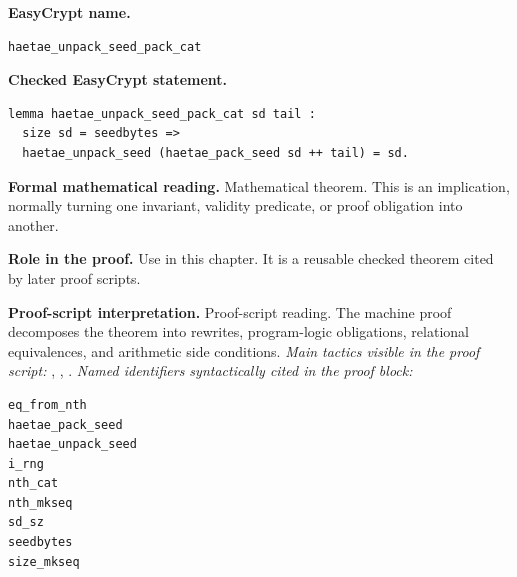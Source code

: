 \begin{formaltheorem}
\noindent\textbf{EasyCrypt name.}
\begin{lstlisting}[language=EasyCrypt,basicstyle=\ttfamily\scriptsize]
haetae_unpack_seed_pack_cat
\end{lstlisting}
\noindent\textbf{Checked EasyCrypt statement.}
\begin{lstlisting}[language=EasyCrypt,basicstyle=\ttfamily\scriptsize]
lemma haetae_unpack_seed_pack_cat sd tail :
  size sd = seedbytes =>
  haetae_unpack_seed (haetae_pack_seed sd ++ tail) = sd.
\end{lstlisting}
\noindent\textbf{Formal mathematical reading.}
Mathematical theorem. This is an implication, normally turning one invariant, validity predicate, or proof obligation into another.

\noindent\textbf{Role in the proof.}
Use in this chapter. It is a reusable checked theorem cited by later proof scripts.

\noindent\textbf{Proof-script interpretation.}
Proof-script reading. The machine proof decomposes the theorem into rewrites, program-logic obligations, relational equivalences, and arithmetic side conditions.
\emph{Main tactics visible in the proof script:} , , .
\emph{Named identifiers syntactically cited in the proof block:}
\begin{lstlisting}[language=EasyCrypt,basicstyle=\ttfamily\scriptsize]
eq_from_nth
haetae_pack_seed
haetae_unpack_seed
i_rng
nth_cat
nth_mkseq
sd_sz
seedbytes
size_mkseq
\end{lstlisting}

\end{formaltheorem}

